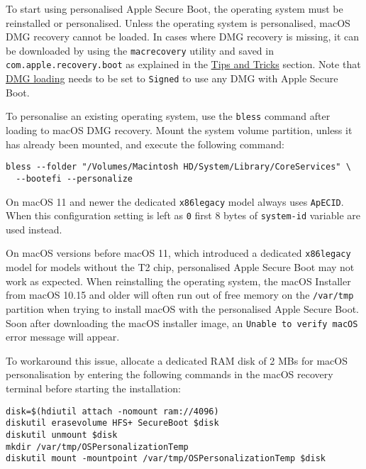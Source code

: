 \documentclass[]{article}
\begin{document}
\begin{enumerate}
  To start using personalised Apple Secure Boot, the operating system must be
  reinstalled or personalised. Unless the operating system is personalised,
  macOS DMG recovery cannot be loaded. In cases where DMG recovery is missing,
  it can be downloaded by using the \texttt{macrecovery} utility and saved in
  \texttt{com.apple.recovery.boot} as explained in the
  \hyperref[reinstallmacos]{Tips and Tricks} section. Note that
  \hyperref[securedmgloading]{DMG loading} needs to be set to \texttt{Signed}
  to use any DMG with Apple Secure Boot.

  To personalise an existing operating system, use the \texttt{bless} command
  after loading to macOS DMG recovery. Mount the system volume partition,
  unless it has already been mounted, and execute the following command:

\begin{lstlisting}[label=blesspersona, style=ocbash]
bless --folder "/Volumes/Macintosh HD/System/Library/CoreServices" \
  --bootefi --personalize
\end{lstlisting}

  On macOS 11 and newer the dedicated \texttt{x86legacy} model always uses
  \texttt{ApECID}. When this configuration setting is left as \texttt{0}
  first 8 bytes of \texttt{system-id} variable are used instead.

  On macOS versions before macOS 11, which introduced a dedicated \texttt{x86legacy}
  model for models without the T2 chip, personalised Apple Secure Boot
  may not work as expected. When reinstalling the operating system, the macOS Installer
  from macOS 10.15 and older will often run out of free memory on the \texttt{/var/tmp}
  partition when trying to install macOS with the personalised Apple Secure Boot.
  Soon after downloading the macOS installer image, an \texttt{Unable to verify macOS}
  error message will appear.

  To workaround this issue, allocate a dedicated RAM disk of 2 MBs for macOS personalisation by
  entering the following commands in the macOS recovery terminal before starting the installation:

\begin{lstlisting}[label=secureboot, style=ocbash]
disk=$(hdiutil attach -nomount ram://4096)
diskutil erasevolume HFS+ SecureBoot $disk
diskutil unmount $disk
mkdir /var/tmp/OSPersonalizationTemp
diskutil mount -mountpoint /var/tmp/OSPersonalizationTemp $disk
\end{lstlisting}


\end{enumerate}
\end{document}
